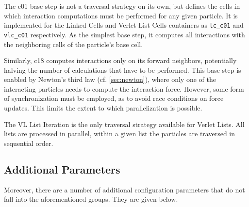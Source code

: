 \begin{description}[leftmargin=!,labelwidth=\widthof{\textbf{VL List Iteration}}]
	\item[\textbf{C01 Base Step}] The c01 base step is not a traversal strategy on its own, but defines the cells in which interaction computations must be performed for any given particle. It is implemented for the Linked Cells and Verlet List Cells containers as \texttt{lc\_c01} and \texttt{vlc\_c01} respectively. As the simplest base step, it computes all interactions with the neighboring cells of the particle’s base cell.
	\item[\textbf{C18 Base Step}] Similarly, c18 computes interactions only on its forward neighbors, potentially halving the number of calculations that have to be performed. This base step is enabled by Newton's third law (cf. \autoref{sec:newton}), where only one of the interacting particles needs to compute the interaction force. However, some form of synchronization must be employed, as to avoid race conditions on force updates. This limits the extent to which parallelization is possible.
	\item[\textbf{VL List Iteration}] The VL List Iteration is the only traversal strategy available for Verlet Lists. All lists are processed in parallel, within a given list the particles are traversed in sequential order. %
\end{description}


\subsection{Additional Parameters}
Moreover, there are a number of additional configuration parameters that do not fall into the aforementioned groups. They are given below.

